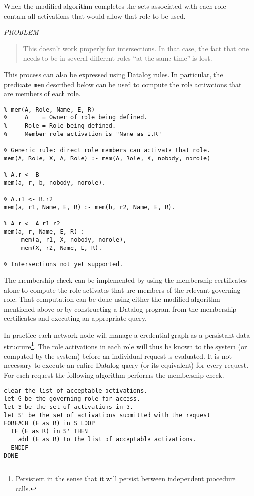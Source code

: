 \documentclass{article}
\newcommand{\predicate}[1]{\texttt{#1}}
\newenvironment{problem}{%
\vspace{2ex}%
\centerline{\textit{PROBLEM}}%
\begin{quote}%
}%
{%
\end{quote}
}
\begin{document}
When the modified algorithm completes the sets associated with each role contain all activations
that would allow that role to be used.

\begin{problem}
This doesn't work properly for intersections. In that case, the fact that one needs to be in several different roles ``at the same time'' is lost.
\end{problem}

This process can also be expressed using Datalog rules. In particular, the predicate
\predicate{mem} described below can be used to compute the role activations that are members of
each role.

\begin{verbatim}
% mem(A, Role, Name, E, R)
%     A    = Owner of role being defined.
%     Role = Role being defined.
%     Member role activation is "Name as E.R"

% Generic rule: direct role members can activate that role.
mem(A, Role, X, A, Role) :- mem(A, Role, X, nobody, norole).

% A.r <- B
mem(a, r, b, nobody, norole).

% A.r1 <- B.r2
mem(a, r1, Name, E, R) :- mem(b, r2, Name, E, R).

% A.r <- A.r1.r2
mem(a, r, Name, E, R) :-
     mem(a, r1, X, nobody, norole),
     mem(X, r2, Name, E, R).
     
% Intersections not yet supported.
\end{verbatim}

The membership check can be implemented by using the membership certificates alone to compute
the role activates that are members of the relevant governing role. That computation can be done
using either the modified algorithm mentioned above or by constructing a Datalog program from
the membership certificates and executing an appropriate query.

In practice each network node will manage a credential graph as a persistant data
structure\footnote{Persistent in the sense that it will persist between independent procedure
  calls.}. The role activations in each role will thus be known to the system (or computed by
the system) before an individual request is evaluated. It is not necessary to execute an entire
Datalog query (or its equivalent) for every request. For each request the following algorithm
performs the membership check.

\begin{verbatim}
clear the list of acceptable activations.
let G be the governing role for access.
let S be the set of activations in G.
let S' be the set of activations submitted with the request.
FOREACH (E as R) in S LOOP
  IF (E as R) in S' THEN
    add (E as R) to the list of acceptable activations.
  ENDIF
DONE
\end{verbatim}
\end{document}
